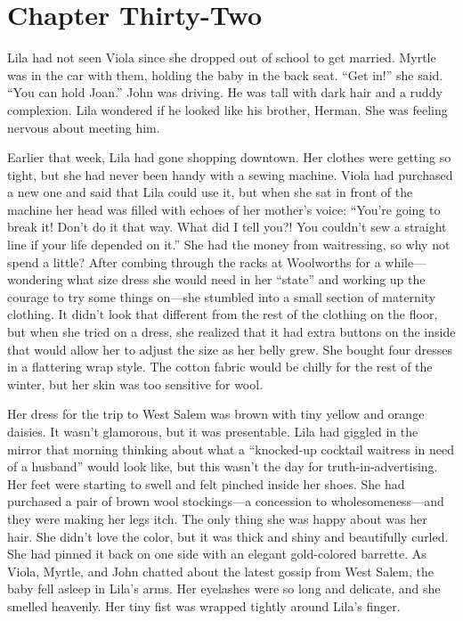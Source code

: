 \documentclass[
  letterpaper,
]{book}
\begin{document}

\chapter{Chapter Thirty-Two}\label{chapter-thirty-two}

Lila had not seen Viola since she dropped out of school to get married.
Myrtle was in the car with them, holding the baby in the back seat.
``Get in!'' she said. ``You can hold Joan.'' John was driving. He was
tall with dark hair and a ruddy complexion. Lila wondered if he looked
like his brother, Herman. She was feeling nervous about meeting him.

Earlier that week, Lila had gone shopping downtown. Her clothes were
getting so tight, but she had never been handy with a sewing machine.
Viola had purchased a new one and said that Lila could use it, but when
she sat in front of the machine her head was filled with echoes of her
mother's voice: ``You're going to break it! Don't do it that way. What
did I tell you?! You couldn't sew a straight line if your life depended
on it.'' She had the money from waitressing, so why not spend a little?
After combing through the racks at Woolworths for a while---wondering
what size dress she would need in her ``state'' and working up the
courage to try some things on---she stumbled into a small section of
maternity clothing. It didn't look that different from the rest of the
clothing on the floor, but when she tried on a dress, she realized that
it had extra buttons on the inside that would allow her to adjust the
size as her belly grew. She bought four dresses in a flattering wrap
style. The cotton fabric would be chilly for the rest of the winter, but
her skin was too sensitive for wool.

Her dress for the trip to West Salem was brown with tiny yellow and
orange daisies. It wasn't glamorous, but it was presentable. Lila had
giggled in the mirror that morning thinking about what a ``knocked-up
cocktail waitress in need of a husband'' would look like, but this
wasn't the day for truth-in-advertising. Her feet were starting to swell
and felt pinched inside her shoes. She had purchased a pair of brown
wool stockings---a concession to wholesomeness---and they were making
her legs itch. The only thing she was happy about was her hair. She
didn't love the color, but it was thick and shiny and beautifully
curled. She had pinned it back on one side with an elegant gold-colored
barrette. As Viola, Myrtle, and John chatted about the latest gossip
from West Salem, the baby fell asleep in Lila's arms. Her eyelashes were
so long and delicate, and she smelled heavenly. Her tiny fist was
wrapped tightly around Lila's finger.
\end{document}
